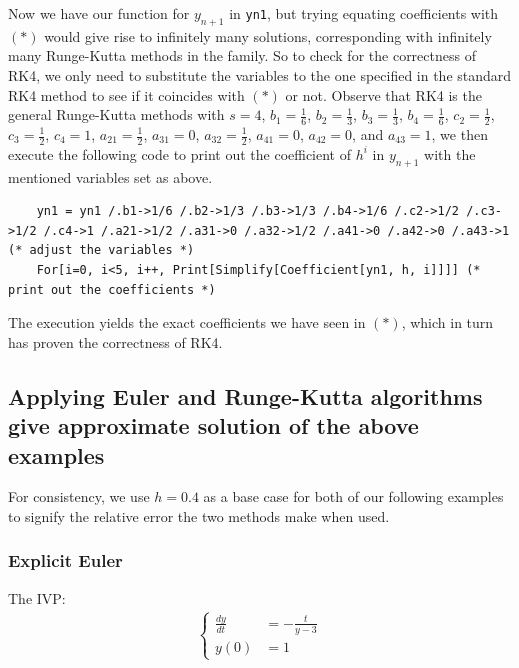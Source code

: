 \documentclass[a4paper]{article}
\numberwithin{equation}{section}
\begin{document}
Now we have our function for \(y_{n+1}\) in \texttt{yn1}, but trying equating coefficients with \((*)\) would give rise to infinitely many solutions, corresponding with infinitely many Runge-Kutta methods in the family. So to check for the correctness of RK4, we only need to substitute the variables to the one specified in the standard RK4 method to see if it coincides with \((*)\) or not. Observe that RK4 is the general Runge-Kutta methods with \(s = 4\), \(b_1 = \frac{1}{6}\), \(b_2 = \frac{1}{3}\), \(b_3 = \frac{1}{3}\), \(b_4 = \frac{1}{6}\), \(c_2 = \frac{1}{2}\), \(c_3 = \frac{1}{2}\), \(c_4 = 1\), \(a_{21} = \frac{1}{2}\), \(a_{31} = 0\), \(a_{32} = \frac{1}{2}\), \(a_{41} = 0\), \(a_{42} = 0\), and \(a_{43} = 1\), we then execute the following code to print out the coefficient of \(h^i\) in \(y_{n+1}\) with the mentioned variables set as above.
\begin{mdframed}[leftline=false,rightline=false,backgroundcolor=magenta!10,nobreak=true]
  \begin{verbatim}
    yn1 = yn1 /.b1->1/6 /.b2->1/3 /.b3->1/3 /.b4->1/6 /.c2->1/2 /.c3->1/2 /.c4->1 /.a21->1/2 /.a31->0 /.a32->1/2 /.a41->0 /.a42->0 /.a43->1 (* adjust the variables *)
    For[i=0, i<5, i++, Print[Simplify[Coefficient[yn1, h, i]]]] (* print out the coefficients *)
  \end{verbatim}
\end{mdframed}

The execution yields the exact coefficients we have seen in \((*)\), which in turn has proven the correctness of RK4.

\subsection{Applying Euler and Runge-Kutta algorithms give approximate solution of the above examples}
For consistency, we use \(h = 0.4\) as a base case for both of our following examples to signify the relative error the two methods make when used.

\subsubsection{Explicit Euler}
The IVP:
\begin{align*}
  \begin{cases}
    \frac{dy}{dt} & = - \frac{t}{y - 3} \\
    y(0)          & = 1
  \end{cases}
\end{align*}
\end{document}
